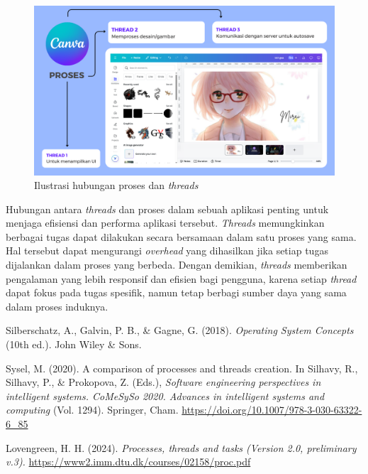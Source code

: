 \documentclass[12pt]{article}
\begin{document}
\begin{enumerate}
\begin{itemize}
        \end{itemize}
    
        \begin{figure}[h]
            \centering
            \includegraphics[width=1\linewidth]{asset/process-and-threads-illustration.png}
            \caption{Ilustrasi hubungan proses dan \textit{threads}}
            \label{fig:ilustrasi-proses-dan-threads}
        \end{figure}
        
    \end{enumerate}
    
    \hspace{1cm}

    Hubungan antara \textit{threads} dan proses dalam sebuah aplikasi penting untuk menjaga efisiensi dan performa aplikasi tersebut. \textit{Threads} memungkinkan berbagai tugas dapat dilakukan secara bersamaan dalam satu proses yang sama. Hal tersebut dapat mengurangi \textit{overhead} yang dihasilkan jika setiap tugas dijalankan dalam proses yang berbeda. Dengan demikian, \textit{threads} memberikan pengalaman yang lebih responsif dan efisien bagi pengguna, karena setiap \textit{thread} dapat fokus pada tugas spesifik, namun tetap berbagi sumber daya yang sama dalam proses induknya.

    \begin{thebibliography}{99}
    
        Silberschatz, A., Galvin, P. B., \& Gagne, G. (2018). \textit{Operating System Concepts} (10th ed.). John Wiley \& Sons.
    
        Sysel, M. (2020). A comparison of processes and threads creation. In Silhavy, R., Silhavy, P., \& Prokopova, Z. (Eds.), \textit{Software engineering perspectives in intelligent systems. CoMeSySo 2020. Advances in intelligent systems and computing} (Vol. 1294). Springer, Cham. \url{https://doi.org/10.1007/978-3-030-63322-6_85}
    
        Lovengreen, H. H. (2024). \textit{Processes, threads and tasks (Version 2.0, preliminary v.3).} \url{https://www2.imm.dtu.dk/courses/02158/proc.pdf}
    
    \end{thebibliography}
    
\end{document}
